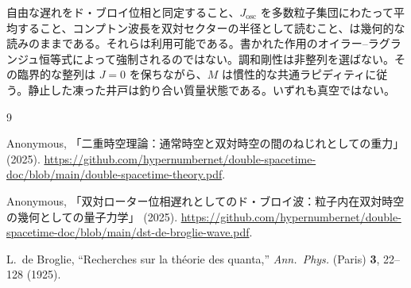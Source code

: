 \documentclass[a4paper]{article}
\begin{document}
自由な遅れをド・ブロイ位相と同定すること、\(J_{\mathrm{osc}}\) を多数粒子集団にわたって平均すること、コンプトン波長を双対セクターの半径として読むこと、は幾何的な読みのままである。それらは利用可能である。書かれた作用のオイラー--ラグランジュ恒等式によって強制されるのではない。調和剛性は非整列を選ばない。その臨界的な整列は \(J=0\) を保ちながら、\(M\) は慣性的な共通ラピディティに従う。静止した凍った井戸は釣り合い質量状態である。いずれも真空ではない。

\begin{thebibliography}{9}
\raggedright

Anonymous,
「二重時空理論：通常時空と双対時空の間のねじれとしての重力」 (2025).
\url{https://github.com/hypernumbernet/double-spacetime-doc/blob/main/double-spacetime-theory.pdf}.

Anonymous,
「双対ローター位相遅れとしてのド・ブロイ波：粒子内在双対時空の幾何としての量子力学」 (2025).
\url{https://github.com/hypernumbernet/double-spacetime-doc/blob/main/dst-de-broglie-wave.pdf}.

L.~de Broglie,
``Recherches sur la th\'eorie des quanta,''
\textit{Ann.\ Phys.} (Paris) \textbf{3}, 22--128 (1925).

\end{thebibliography}
\end{document}
